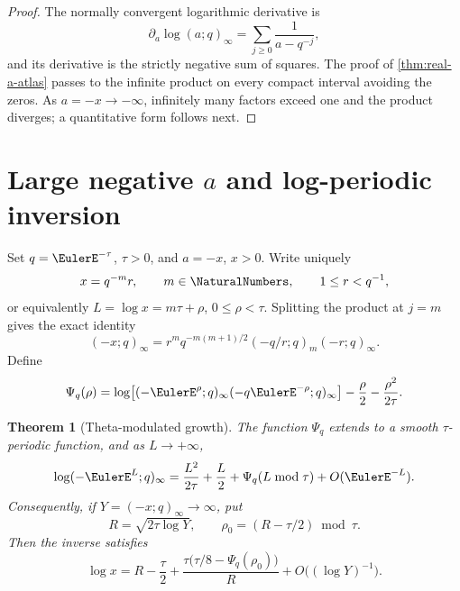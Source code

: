 \documentclass[11pt,a4paper,oneside,openany]{book}
\newtheorem{theorem}{Theorem}[chapter]
\theoremstyle{definition}
\theoremstyle{remark}
\begin{document}
\begin{proof}
The normally convergent logarithmic derivative is
\[
 \partial_a\log(a;q)_\infty
 =\sum_{j\ge0}\frac1{a-q^{-j}},
\]
and its derivative is the strictly negative sum of squares.  The proof of
\cref{thm:real-a-atlas} passes to the infinite product on every compact
interval avoiding the zeros.  As \(a=-x\to-\infty\), infinitely many factors
exceed one and the product diverges; a quantitative form follows next.
\end{proof}

\section{Large negative \texorpdfstring{$a$}{a} and log-periodic inversion}

Set \(q=\EulerE^{-\tau}\), \(\tau>0\), and \(a=-x\), \(x>0\).  Write uniquely
\[
 x=q^{-m}r,\qquad m\in\NaturalNumbers,\qquad 1\le r<q^{-1},
\]
or equivalently \(L=\log x=m\tau+\rho\), \(0\le\rho<\tau\).  Splitting the
product at \(j=m\) gives the exact identity
\begin{equation}\label{eq:negative-a-exact-split}
 (-x;q)_\infty
 =r^m q^{-m(m+1)/2}(-q/r;q)_m(-r;q)_\infty.
\end{equation}
Define
\begin{equation}\label{eq:Psi-definition}
 \Psi_q(\rho)=
 \log\!\left[(-\EulerE^\rho;q)_\infty(-q\EulerE^{-\rho};q)_\infty\right]
 -\frac\rho2-\frac{\rho^2}{2\tau}.
\end{equation}

\begin{theorem}[Theta-modulated growth]\label{thm:log-periodic-growth}
The function \(\Psi_q\) extends to a smooth \(\tau\)-periodic function, and
as \(L\to+\infty\),
\begin{equation}\label{eq:negative-a-log-growth}
 \log(-\EulerE^L;q)_\infty
 =\frac{L^2}{2\tau}+\frac L2+\Psi_q(L\bmod\tau)+O(\EulerE^{-L}).
\end{equation}
Consequently, if \(Y=(-x;q)_\infty\to\infty\), put
\[
 R=\sqrt{2\tau\log Y},\qquad
 \rho_0=(R-\tau/2)\bmod\tau.
\]
Then the inverse satisfies
\begin{equation}\label{eq:negative-a-inverse}
 \log x
 =R-\frac\tau2
 +\frac{\tau\bigl(\tau/8-\Psi_q(\rho_0)\bigr)}{R}
 +O\bigl((\log Y)^{-1}\bigr).
\end{equation}
\end{theorem}
\end{document}
